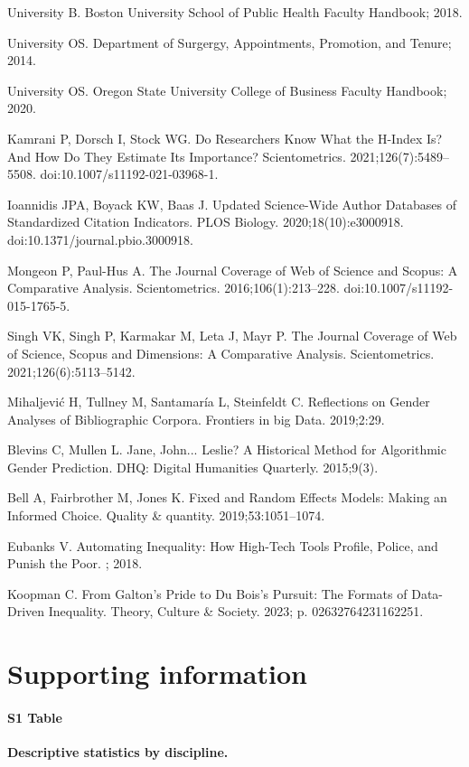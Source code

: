 \documentclass[
  10pt,
  letterpaper,
]{article}
\begin{document}
\begin{thebibliography}{10}
University B.
\newblock Boston {{University School}} of {{Public Health Faculty Handbook}}; 2018.

University OS.
\newblock Department of {{Surgergy}}, {{Appointments}}, {{Promotion}}, and {{Tenure}}; 2014.

University OS.
\newblock Oregon {{State University College}} of {{Business Faculty Handbook}}; 2020.

Kamrani P, Dorsch I, Stock WG.
\newblock Do Researchers Know What the H-Index Is? {{And}} How Do They Estimate Its Importance?
\newblock Scientometrics. 2021;126(7):5489--5508.
\newblock doi:{10.1007/s11192-021-03968-1}.

Ioannidis JPA, Boyack KW, Baas J.
\newblock Updated Science-Wide Author Databases of Standardized Citation Indicators.
\newblock PLOS Biology. 2020;18(10):e3000918.
\newblock doi:{10.1371/journal.pbio.3000918}.

Mongeon P, {Paul-Hus} A.
\newblock The Journal Coverage of {{Web}} of {{Science}} and {{Scopus}}: A Comparative Analysis.
\newblock Scientometrics. 2016;106(1):213--228.
\newblock doi:{10.1007/s11192-015-1765-5}.

Singh VK, Singh P, Karmakar M, Leta J, Mayr P.
\newblock The Journal Coverage of {{Web}} of {{Science}}, {{Scopus}} and {{Dimensions}}: {{A}} Comparative Analysis.
\newblock Scientometrics. 2021;126(6):5113--5142.

Mihaljevi{\'c} H, Tullney M, Santamar{\'i}a L, Steinfeldt C.
\newblock Reflections on Gender Analyses of Bibliographic Corpora.
\newblock Frontiers in big Data. 2019;2:29.

Blevins C, Mullen L.
\newblock Jane, {{John}}... {{Leslie}}? {{A Historical Method}} for {{Algorithmic Gender Prediction}}.
\newblock DHQ: Digital Humanities Quarterly. 2015;9(3).

Bell A, Fairbrother M, Jones K.
\newblock Fixed and Random Effects Models: Making an Informed Choice.
\newblock Quality \& quantity. 2019;53:1051--1074.

Eubanks V.
\newblock Automating Inequality: {{How}} High-Tech Tools Profile, Police, and Punish the Poor.
; 2018.

Koopman C.
\newblock From {{Galton}}'s {{Pride}} to {{Du Bois}}'s {{Pursuit}}: {{The Formats}} of {{Data-Driven Inequality}}.
\newblock Theory, Culture \& Society. 2023; p. 02632764231162251.

\end{thebibliography}


\hypertarget{supporting-information}{%
\section{Supporting information}\label{supporting-information}}

\paragraph*{S1 Table}
\label{id}
{\textbf{Descriptive statistics by discipline.}}


\nolinenumbers
\end{document}
